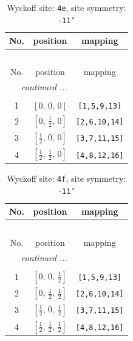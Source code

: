 \documentclass[fleqn,8pt]{jsarticle}
\begin{document}
\begin{longtable}{ccc}
\caption{Wyckoff site: {\tt 4e}, site symmetry: {\tt -11'}}
 \\
 \hline \hline
No. & position & mapping \\ \hline \endfirsthead

\multicolumn{2}{l}{\tablename\ \thetable{}} \\
 \hline \hline
No. & position & mapping \\ \hline \endhead

 \hline \hline
\multicolumn{2}{r}{\footnotesize\it continued ...} \\ \endfoot

 \hline \hline
\multicolumn{2}{r}{} \\ \endlastfoot

1 & $\left[ 0,\, 0,\, 0 \right]$ & {\tt [1,5,9,13]} \\ \hline
2 & $\left[ 0,\, \frac{1}{2},\, 0 \right]$ & {\tt [2,6,10,14]} \\ \hline
3 & $\left[ \frac{1}{2},\, 0,\, 0 \right]$ & {\tt [3,7,11,15]} \\ \hline
4 & $\left[ \frac{1}{2},\, \frac{1}{2},\, 0 \right]$ & {\tt [4,8,12,16]} \\
\end{longtable}
\renewcommand{\arraystretch}{1.2}
\begin{longtable}{ccc}
\caption{Wyckoff site: {\tt 4f}, site symmetry: {\tt -11'}}
 \\
 \hline \hline
No. & position & mapping \\ \hline \endfirsthead

\multicolumn{2}{l}{\tablename\ \thetable{}} \\
 \hline \hline
No. & position & mapping \\ \hline \endhead

 \hline \hline
\multicolumn{2}{r}{\footnotesize\it continued ...} \\ \endfoot

 \hline \hline
\multicolumn{2}{r}{} \\ \endlastfoot

1 & $\left[ 0,\, 0,\, \frac{1}{2} \right]$ & {\tt [1,5,9,13]} \\ \hline
2 & $\left[ 0,\, \frac{1}{2},\, \frac{1}{2} \right]$ & {\tt [2,6,10,14]} \\ \hline
3 & $\left[ \frac{1}{2},\, 0,\, \frac{1}{2} \right]$ & {\tt [3,7,11,15]} \\ \hline
4 & $\left[ \frac{1}{2},\, \frac{1}{2},\, \frac{1}{2} \right]$ & {\tt [4,8,12,16]} \\
\end{longtable}
\end{document}
